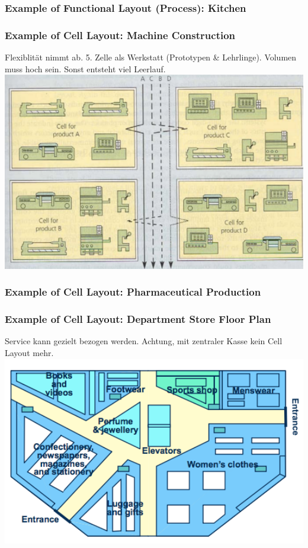 \subsubsection{Example of Functional Layout (Process): Kitchen}
\subsubsection{Example of Cell Layout: Machine Construction}
Flexiblit\"at nimmt ab. 5. Zelle als Werkstatt (Prototypen \& Lehrlinge). Volumen muss hoch sein. Sonst entsteht viel Leerlauf.\\
\includegraphics[width=1\textwidth]{W05/celllayoutmachine}
\subsubsection{Example of Cell Layout: Pharmaceutical Production}
\subsubsection{Example of Cell Layout: Department Store Floor Plan}
Service kann gezielt bezogen werden. Achtung, mit zentraler Kasse kein Cell Layout mehr.\\
\includegraphics[width=1\textwidth]{W05/departementstore}
